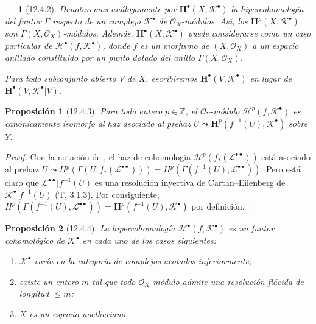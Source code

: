 \documentclass[10pt,oneside,openany]{book}
\theoremstyle{egaenv}\newtheorem*{env}{---}
\theoremstyle{egastatement}
\newtheorem*{proposition}{Proposición}
\theoremstyle{egadescription}
\renewcommand{\leq}{\leqslant}
\begin{document}
\begin{env}[12.4.2]
\label{0.12.4.2}
\label{0.12.4.2-fr}
Denotaremos análogamente por $\mathbf H^\bullet(X,\mathcal K^\bullet)$ la
hipercohomología del funtor $\Gamma$ respecto de un complejo
$\mathcal K^\bullet$ de $\mathcal O_X$-módulos.
Así, los $\mathbf H^p(X,\mathcal K^\bullet)$ son
$\Gamma(X,\mathcal O_X)$-módulos.
Además, $\mathbf H^\bullet(X,\mathcal K^\bullet)$ puede considerarse como un
caso particular de $\mathscr H^\bullet(f,\mathcal K^\bullet)$, donde $f$ es un
morfismo de $(X,\mathcal O_X)$ a un espacio anillado constituido por un punto
dotado del anillo $\Gamma(X,\mathcal O_X)$.

Para todo subconjunto abierto $V$ de $X$, escribiremos
$\mathbf H^\bullet(V,\mathcal K^\bullet)$ en lugar de
$\mathbf H^\bullet(V,\mathcal K^\bullet|V)$.
\end{env}

\begin{proposition}[12.4.3]
\label{0.12.4.3}
\label{0.12.4.3-fr}
Para todo entero $p\in\mathbb Z$, el $\mathcal O_Y$-módulo
$\mathscr H^p(f,\mathcal K^\bullet)$ es canónicamente isomorfo al haz
asociado al prehaz
$U\leadsto\mathbf H^p(f^{-1}(U),\mathcal K^\bullet)$
sobre $Y$.
\end{proposition}

\begin{proof}
Con la notación de , el haz de cohomología
$\mathcal H^p(f_*(\mathcal L^{\bullet\bullet}))$ está asociado al
prehaz
$U\leadsto H^p(\Gamma(U,f_*(\mathcal L^{\bullet\bullet})))=H^p(\Gamma(f^{-1}(U),\mathcal L^{\bullet\bullet}))$.
Pero está claro que
$\mathcal L^{\bullet\bullet}|f^{-1}(U)$ es una resolución inyectiva de
Cartan--Eilenberg de $\mathcal K^\bullet|f^{-1}(U)$ (T, 3.1.3).
Por consiguiente,
$H^p(\Gamma(f^{-1}(U),\mathcal L^{\bullet\bullet}))=\mathbf H^p(f^{-1}(U),\mathcal K^\bullet)$
por definición.
\end{proof}

\begin{proposition}[12.4.4]
\label{0.12.4.4}
\label{0.12.4.4-fr}
La hipercohomología $\mathscr H^\bullet(f,\mathcal K^\bullet)$ es un
funtor cohomológico de $\mathcal K^\bullet$ en cada uno de los casos
siguientes:
\begin{enumerate}
  \item[\rm{a)}] $\mathcal K^\bullet$ varía en la categoría de complejos
    acotados inferiormente;
  \item[\rm{b)}] existe un entero $m$ tal que todo
    $\mathcal O_X$-módulo admite una resolución flácida de longitud $\leq m$;
  \item[\rm{c)}] $X$ es un espacio noetheriano.
\end{enumerate}
\end{proposition}
\end{document}
